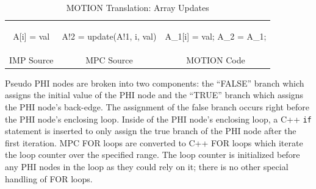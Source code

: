 \begin{table}
\begin{tabular}{ccc}
\begin{minipage}{0.33\textwidth}
{\small
\begin{pythonn}
A[i] = val
\end{pythonn}
}
\end{minipage}

&

\begin{minipage}{0.33\textwidth}
{\small
\begin{pythonn}
A!2 = update(A!1, i, val)
\end{pythonn}
}
\end{minipage}

&

\begin{minipage}{0.33\textwidth}
{\small
\begin{cppp}
A_1[i] = val;
A_2 = A_1;
\end{cppp}
}
\end{minipage}

\\

IMP Source & MPC Source & MOTION Code
\end{tabular}
\caption{MOTION Translation: Array Updates}
\label{tab:motion_translation_array_updates}
\end{table}

Pseudo PHI nodes are broken into two components: the ``FALSE'' branch which assigns the initial value of the PHI node and the ``TRUE'' branch which assigns the PHI node's back-edge.  The assignment of the false branch occurs right before the PHI node's enclosing loop.  Inside of the PHI node's enclosing loop, a C++ \texttt{if} statement is inserted to only assign the true branch of the PHI node after the first iteration. MPC FOR loops are converted to C++ FOR loops which iterate the loop counter over the specified range.  The loop counter is initialized before any PHI nodes in the loop as they could rely on it; there is no other special handling of FOR loops. 


